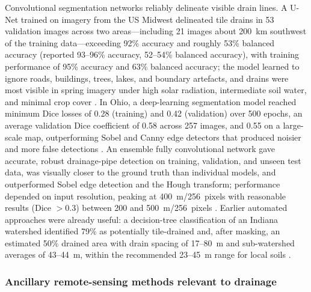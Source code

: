 \documentclass[11pt]{article}
\begin{document}
Convolutional segmentation networks reliably delineate visible drain lines. A
U-Net trained on imagery from the US Midwest delineated tile drains in 53
validation images across two areas---including 21 images about 200~km southwest
of the training data---exceeding 92\% accuracy and roughly 53\% balanced
accuracy (reported 93--96\% accuracy, 52--54\% balanced accuracy), with training
performance of 95\% accuracy and 63\% balanced accuracy; the model learned to
ignore roads, buildings, trees, lakes, and boundary artefacts, and drains were
most visible in spring imagery under high solar radiation, intermediate soil
water, and minimal crop cover \parencite{Redoloza2023}. In Ohio, a
deep-learning segmentation model reached minimum Dice losses of 0.28 (training)
and 0.42 (validation) over 500 epochs, an average validation Dice coefficient of
0.58 across 257 images, and 0.55 on a large-scale map, outperforming Sobel and
Canny edge detectors that produced noisier and more false detections
\parencite{Song2021}. An ensemble fully convolutional network gave accurate,
robust drainage-pipe detection on training, validation, and unseen test data,
was visually closer to the ground truth than individual models, and outperformed
Sobel edge detection and the Hough transform; performance depended on input
resolution, peaking at 400~m/256~pixels with reasonable results (Dice $>0.3$)
between 200 and 500~m/256~pixels \parencite{Woo2023}. Earlier automated
approaches were already useful: a decision-tree classification of an Indiana
watershed identified 79\% as potentially tile-drained and, after masking, an
estimated 50\% drained area with drain spacing of 17--80~m and sub-watershed
averages of 43--44~m, within the recommended 23--45~m range for local soils
\parencite{Naz2009}.

\subsubsection{Ancillary remote-sensing methods relevant to drainage}
\end{document}
